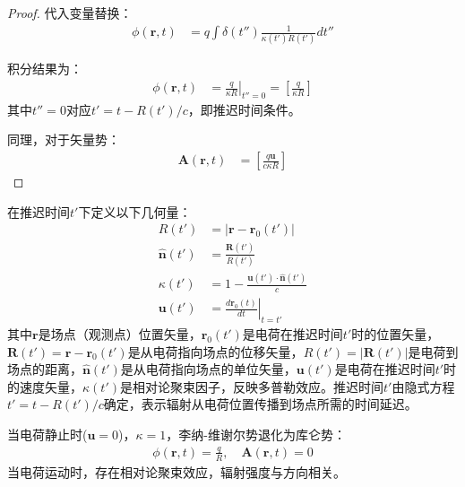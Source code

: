 \begin{proof}
代入变量替换：
\begin{align}
\phi(\mathbf{r},t) &= q\int \delta(t'')\frac{1}{\kappa(t')R(t')}dt''
\end{align}

积分结果为：
\begin{align}
\phi(\mathbf{r},t) &= \left.\frac{q}{\kappa R}\right|_{t''=0} = \left[\frac{q}{\kappa R}\right]
\end{align}
其中$t''=0$对应$t' = t - R(t')/c$，即推迟时间条件。

同理，对于矢量势：
\begin{align}
\mathbf{A}(\mathbf{r},t) &= \left[\frac{q\mathbf{u}}{c\kappa R}\right]
\end{align}
\end{proof}

\begin{definition}[李纳-维谢尔势的几何量]
在推迟时间$t'$下定义以下几何量：
\begin{align}
R(t') &= |\mathbf{r}-\mathbf{r}_0(t')| \\
\hat{\mathbf{n}}(t') &= \frac{\mathbf{R}(t')}{R(t')} \\
\kappa(t') &= 1 - \frac{\mathbf{u}(t')\cdot\hat{\mathbf{n}}(t')}{c} \\
\mathbf{u}(t') &= \left.\frac{d\mathbf{r}_0(t)}{dt}\right|_{t=t'}
\end{align}
其中$\mathbf{r}$是场点（观测点）位置矢量，$\mathbf{r}_0(t')$是电荷在推迟时间$t'$时的位置矢量，$\mathbf{R}(t') = \mathbf{r} - \mathbf{r}_0(t')$是从电荷指向场点的位移矢量，$R(t') = |\mathbf{R}(t')|$是电荷到场点的距离，$\hat{\mathbf{n}}(t')$是从电荷指向场点的单位矢量，$\mathbf{u}(t')$是电荷在推迟时间$t'$时的速度矢量，$\kappa(t')$是相对论聚束因子，反映多普勒效应。推迟时间$t'$由隐式方程$t' = t - R(t')/c$确定，表示辐射从电荷位置传播到场点所需的时间延迟。
\end{definition}

\begin{example}[与静电场的比较]
当电荷静止时($\mathbf{u}=0$)，$\kappa=1$，李纳-维谢尔势退化为库仑势：
\begin{align}
\phi(\mathbf{r},t) = \frac{q}{R},\quad \mathbf{A}(\mathbf{r},t) = 0
\end{align}
当电荷运动时，存在相对论聚束效应，辐射强度与方向相关。
\end{example}


